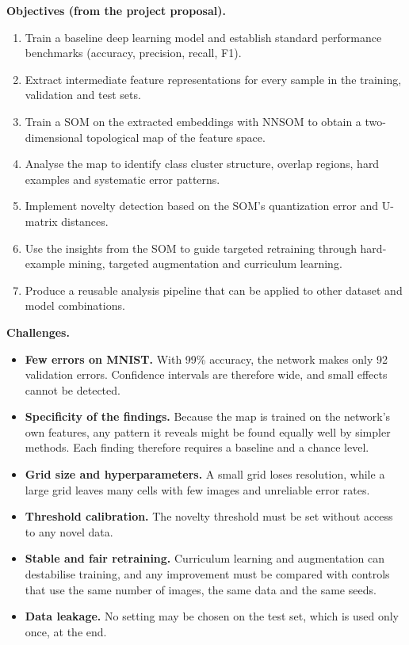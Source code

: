 \documentclass{scrartcl}
\begin{document}
\textbf{Objectives (from the project proposal).}
\begin{enumerate}
  \item Train a baseline deep learning model and establish standard performance benchmarks (accuracy, precision, recall, F1).
  \item Extract intermediate feature representations for every sample in the training, validation and test sets.
  \item Train a SOM on the extracted embeddings with NNSOM to obtain a two-dimensional topological map of the feature space.
  \item Analyse the map to identify class cluster structure, overlap regions, hard examples and systematic error patterns.
  \item Implement novelty detection based on the SOM's quantization error and U-matrix distances.
  \item Use the insights from the SOM to guide targeted retraining through hard-example mining, targeted augmentation and curriculum learning.
  \item Produce a reusable analysis pipeline that can be applied to other dataset and model combinations.
\end{enumerate}

\textbf{Challenges.}
\begin{itemize}
  \item \textbf{Few errors on MNIST.} With 99\% accuracy, the network makes only 92 validation errors. Confidence intervals are therefore wide, and small effects cannot be detected.
  \item \textbf{Specificity of the findings.} Because the map is trained on the network's own features, any pattern it reveals might be found equally well by simpler methods. Each finding therefore requires a baseline and a chance level.
  \item \textbf{Grid size and hyperparameters.} A small grid loses resolution, while a large grid leaves many cells with few images and unreliable error rates.
  \item \textbf{Threshold calibration.} The novelty threshold must be set without access to any novel data.
  \item \textbf{Stable and fair retraining.} Curriculum learning and augmentation can destabilise training, and any improvement must be compared with controls that use the same number of images, the same data and the same seeds.
  \item \textbf{Data leakage.} No setting may be chosen on the test set, which is used only once, at the end.
\end{itemize}
\end{document}
